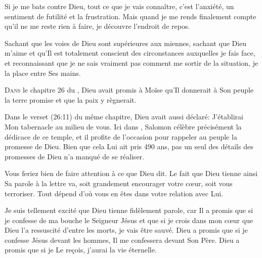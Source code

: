 Si je me bats contre Dieu, tout ce que je vais connaître, c'est l'anxiété,
 un sentiment de futilité et la frustration.
 Mais quand je me rends finalement compte qu'il ne me reste rien à faire,
 je découvre l'endroit de repos. 

Sachant que les voies de Dieu sont supérieures aux miennes,
 sachant que Dieu m'aime et qu'Il est totalement conscient des circonstances
 auxquelles je fais face, et reconnaissant que je ne sais vraiment pas comment
 me sortir de la situation, je la place entre Ses mains. 

\dvrule






\lettrine{D}{ans} le chapitre 26 du ,
 Dieu avait promis à Moïse qu'Il donnerait à Son peuple
 la terre promise et que la paix y règnerait.

Dans le verset (26:11) du même chapitre, Dieu avait aussi déclaré:
 \Og J'établirai Mon tabernacle au milieu de vous. \Fg{}
 Ici dans , Salomon célèbre précisément
 la dédicace de ce temple, et il profite de l'occasion pour rappeler au peuple
 la promesse de Dieu.
 Bien que cela Lui ait pris 490 ans, pas un seul des détails des promesses
 de Dieu n'a manqué de se réaliser. 


Vous feriez bien de faire attention à ce que Dieu dit.
 Le fait que Dieu tienne ainsi Sa parole à la lettre va,
 soit grandement encourager votre c\oe{}ur, soit vous terroriser.
 Tout dépend d'où vous en êtes dans votre relation avec Lui. 

Je suis tellement excité que Dieu tienne fidèlement parole,
 car Il a promis que si je confesse de ma bouche le Seigneur Jésus
 et que si je crois dans mon c\oe{}ur que Dieu l'a ressuscité
 d'entre les morts, je vais être sauvé.
 Dieu a promis que si je confesse Jésus devant les hommes,
 Il me confessera devant Son Père.
 Dieu a promis que si je Le re\c{c}ois, j'aurai la vie éternelle. 


